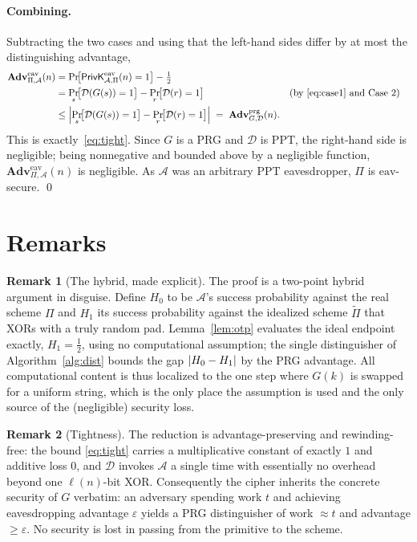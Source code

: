 \documentclass[11pt]{article}
\theoremstyle{plain}
\theoremstyle{definition}
\newtheorem{remark}{Remark}
\newcommand{\secp}{n}                       %
\newcommand{\adv}{\mathcal{A}}
\newcommand{\dist}{\mathcal{D}}
\newcommand{\PPT}{\mathrm{PPT}}
\DeclarePairedDelimiter{\abs}{\lvert}{\rvert}
\newcommand{\Adv}{\mathbf{Adv}}
\newcommand{\PrivK}{\mathsf{PrivK}}
\newcommand{\eav}{\mathrm{eav}}
\newcommand{\prg}{\mathrm{prg}}
\newcommand{\Pron}{\Pi}
\newcommand{\Ptilde}{\widetilde{\Pi}}
\begin{document}
\paragraph{Combining.} Subtracting the two cases and using that the left-hand
sides differ by at most the distinguishing advantage,
\begin{align*}
  \Adv^{\eav}_{\Pron,\adv}(\secp)
  &= \Pr\!\bigl[\PrivK^{\eav}_{\adv,\Pron}(\secp) = 1\bigr] - \tfrac12 \\
  &= \Pr_{s}\!\bigl[\dist(G(s)) = 1\bigr]
     - \Pr_{r}\!\bigl[\dist(r) = 1\bigr]
     && \text{(by \eqref{eq:case1} and Case 2)} \\
  &\leq \Bigl\lvert
        \Pr_{s}\!\bigl[\dist(G(s)) = 1\bigr]
        - \Pr_{r}\!\bigl[\dist(r) = 1\bigr]
        \Bigr\rvert
     \;=\; \Adv^{\prg}_{G,\dist}(\secp).
\end{align*}
This is exactly~\eqref{eq:tight}. Since $G$ is a PRG and $\dist$ is $\PPT$, the
right-hand side is negligible; being nonnegative and bounded above by a
negligible function, $\Adv^{\eav}_{\Pron,\adv}(\secp)$ is negligible. As $\adv$
was an arbitrary $\PPT$ eavesdropper, $\Pron$ is $\eav$-secure. \qed

\section{Remarks}

\begin{remark}[The hybrid, made explicit]
The proof is a two-point hybrid argument in disguise. Define
$H_0$ to be $\adv$'s success probability against the real scheme $\Pron$ and
$H_1$ its success probability against the idealized scheme $\Ptilde$ that XORs
with a truly random pad. Lemma~\ref{lem:otp} evaluates the ideal endpoint
exactly, $H_1 = \tfrac12$, using no computational assumption; the single
distinguisher of Algorithm~\ref{alg:dist} bounds the gap $\abs{H_0 - H_1}$ by the
PRG advantage. All computational content is thus localized to the one step where
$G(k)$ is swapped for a uniform string, which is the only place the assumption is
used and the only source of the (negligible) security loss.
\end{remark}

\begin{remark}[Tightness]
The reduction is advantage-preserving and rewinding-free: the bound
\eqref{eq:tight} carries a multiplicative constant of exactly $1$ and additive
loss $0$, and $\dist$ invokes $\adv$ a single time with essentially no overhead
beyond one $\ell(\secp)$-bit XOR. Consequently the cipher inherits the concrete
security of $G$ verbatim: an adversary spending work $t$ and achieving
eavesdropping advantage $\varepsilon$ yields a PRG distinguisher of work
$\approx t$ and advantage $\geq \varepsilon$. No security is lost in passing from
the primitive to the scheme.
\end{remark}
\end{document}
